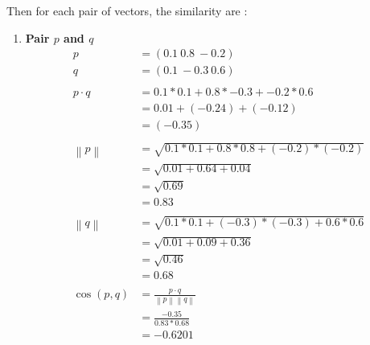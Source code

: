 \documentclass[12pt]{article}%
\begin{document}
\begin{enumerate}
\begin{enumerate}
		\par Then for each pair of vectors, the similarity are :
		\begin{enumerate}
			\item \textbf{Pair $p$ and $q$}
			\begin{align*}
				 p & = (0.1 \ 0.8 \ -0.2) \\ 
				 q & = (0.1 \ -0.3 \ 0.6) \\ 
				 \\
				 p \cdot q & = 0.1 * 0.1 + 0.8 * -0.3 + -0.2 * 0.6 \\
				 & = 0.01 + (-0.24) + (-0.12) \\
				 & = (-0.35)\\ 
				 \\
				 \left \| p \right \| & = \sqrt{0.1 * 0.1 + 0.8 * 0.8 + (-0.2)*(-0.2)} \\
				 & = \sqrt{0.01 + 0.64 + 0.04} \\
				 & = \sqrt{0.69} \\
				 & = 0.83\\
				 \\
				 \left \| q \right \| & = \sqrt{0.1 * 0.1 + (-0.3) * (-0.3) + 0.6*0.6} \\
				 & = \sqrt{0.01 + 0.09 + 0.36} \\ 
				 & = \sqrt{0.46} \\
				 & = 0.68 \\
				 \\
				 \cos (p,q) & = \frac{p\cdot q}{\left \| p \right \| \left \| q \right \|} \\
				 & = \frac{-0.35}{0.83 * 0.68} \\
				 & = -0.6201 \\ %
			\end{align*}
			

\end{enumerate}
\end{enumerate}
\end{enumerate}
\end{document}
